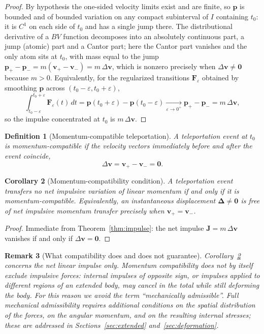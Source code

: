 \documentclass[11pt]{article}
\newtheorem{definition}{Definition}[section]
\newtheorem{remark}[definition]{Remark}
\newtheorem{corollary}[definition]{Corollary}
\begin{document}
	\begin{proof}
		By hypothesis the one-sided velocity limits exist and are finite, so
		$\mathbf p$ is bounded and of bounded variation on any compact
		subinterval of $I$ containing $t_0$: it is $C^{1}$ on each side of
		$t_0$ and has a single jump there. The distributional derivative of
		a $BV$ function decomposes into an absolutely continuous part, a
		jump (atomic) part and a Cantor part; here the Cantor part vanishes
		and the only atom sits at $t_0$, with mass equal to the jump
		$\mathbf p_{+}-\mathbf p_{-}=m(\mathbf v_{+}-\mathbf v_{-})
		=m\,\Delta\mathbf v$, which is nonzero precisely when
		$\Delta\mathbf v\neq\mathbf 0$ because $m>0$. Equivalently, for the
		regularized transitions $\mathbf F_\varepsilon$ obtained by
		smoothing $\mathbf p$ across $(t_0-\varepsilon,t_0+\varepsilon)$,
		\[
		\int_{t_0-\varepsilon}^{t_0+\varepsilon}\mathbf F_\varepsilon(t)\,dt
		=\mathbf p(t_0+\varepsilon)-\mathbf p(t_0-\varepsilon)
		\xrightarrow[\varepsilon\to0^{+}]{}
		\mathbf p_{+}-\mathbf p_{-}=m\,\Delta\mathbf v,
		\]
		so the impulse concentrated at $t_0$ is $m\,\Delta\mathbf v$.
	\end{proof}
	
	\begin{definition}[Momentum-compatible teleportation]
		\label{def:admissible}
		A teleportation event at $t_0$ is \emph{momentum-compatible} if the
		velocity vectors immediately before and after the event coincide,
		\[
		\Delta\mathbf v=\mathbf v_{+}-\mathbf v_{-}=\mathbf 0.
		\]
	\end{definition}
	
	\begin{corollary}[Momentum-compatibility condition]
		\label{cor:compat}
		A teleportation event transfers no net impulsive variation of linear
		momentum if and only if it is momentum-compatible. Equivalently, an
		instantaneous displacement $\boldsymbol\Delta\neq\mathbf 0$ is free
		of net impulsive momentum transfer precisely when
		$\mathbf v_{+}=\mathbf v_{-}$.
	\end{corollary}
	
	\begin{proof}
		Immediate from Theorem~\ref{thm:impulse}: the net impulse
		$\mathbf J=m\,\Delta\mathbf v$ vanishes if and only if
		$\Delta\mathbf v=\mathbf 0$.
	\end{proof}
	
	\begin{remark}[What compatibility does and does not guarantee]
		\label{rem:not-admissible}
		Corollary~\ref{cor:compat} concerns the \emph{net} linear impulse
		only. Momentum compatibility does not by itself exclude impulsive
		forces: internal impulses of opposite sign, or impulses applied to
		different regions of an extended body, may cancel in the total while
		still deforming the body. For this reason we avoid the term
		``mechanically admissible''. Full mechanical admissibility requires
		additional conditions on the spatial distribution of the forces, on
		the angular momentum, and on the resulting internal stresses; these
		are addressed in Sections~\ref{sec:extended} and~\ref{sec:deformation}.
	\end{remark}
	
\end{document}
